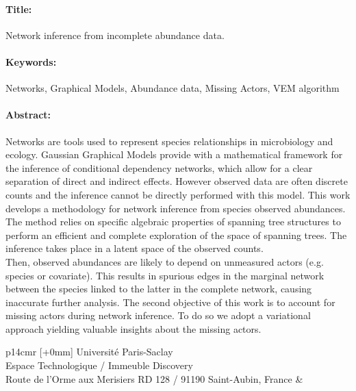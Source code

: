 \begin{mdframed}[linecolor=Prune,linewidth=1]
\vspace{-.25cm}
\paragraph*{Title:} Network inference from incomplete abundance data.
\begin{small}
\vspace{-.25cm}
\paragraph*{Keywords:} Networks, Graphical Models, Abundance data, Missing Actors, VEM algorithm

\vspace{-.5cm}
\begin{multicols}{2}
\paragraph*{Abstract:} 

Networks are tools used to represent species relationships in microbiology and ecology. Gaussian Graphical Models provide with a mathematical framework for the inference of conditional dependency networks, which allow for a clear separation of direct and indirect effects. However observed data are often discrete counts and the inference cannot be directly performed with this model. This work develops a methodology for network inference from species observed abundances. The method relies on specific algebraic properties of spanning tree structures to perform an efficient and complete exploration of the space of spanning trees. The inference takes place in a latent space of the observed counts.\\
Then, observed abundances are likely to depend on unmeasured actors (e.g. species or covariate). This results in spurious edges in the marginal network between the species linked to the latter in the complete network, causing inaccurate further analysis. The second objective of this work is to account for  missing actors during network inference. To do so we adopt a variational approach yielding valuable insights about the missing actors.

\end{multicols}
\end{small}
\end{mdframed}

\vspace{3cm} %
\selectfont
\begin{tabular}{p{14cm}r}
[+0mm]{{\color{Prune} Université Paris-Saclay\\
Espace Technologique / Immeuble Discovery\\
Route de l’Orme aux Merisiers RD 128 / 91190 Saint-Aubin, France}} & %
\end{tabular}
